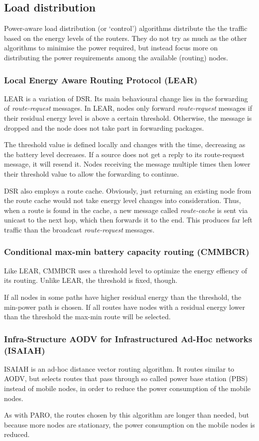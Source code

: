 \subsection{Load distribution}
Power-aware load distribution (or `control') algorithms distribute the the
traffic based on the energy levels of the routers.
They do not try as much as the other algorithms to minimise the power required,
but instead focus more on distributing the power requirements among the available (routing) nodes.

\subsubsection{Local Energy Aware Routing Protocol (LEAR)}
LEAR\cite{woo2001non} is a variation of DSR.
Its main behavioural change lies in the forwarding of \textit{route-request} messages.
In LEAR, nodes only forward \textit{route-request} messages if their residual
energy level is above a certain threshold. Otherwise, the message is dropped
and the node does not take part in forwarding packages.

The threshold value is defined locally and changes with the time, decreasing
as the battery level decreases. If a source does not get a reply to its
route-request message, it will resend it. Nodes receiving the message multiple
times then lower their threshold value to allow the forwarding to continue.

DSR also employs a route cache. Obviously, just returning an existing node
from the route cache would not take energy level changes into consideration.
Thus, when a route is found in the cache, a new message called \textit{route-cache}
is sent via unicast to the next hop, which then forwards it to the end. This
produces far left traffic than the broadcast \textit{route-request} messages.

\subsubsection{Conditional max-min battery capacity routing (CMMBCR)}
Like LEAR, CMMBCR\cite{toh2001maximum} uses a threshold level to optimize
the energy effiency of its routing.
Unlike LEAR, the threshold is fixed, though.

If all nodes in some paths have higher residual energy than the threshold,
the min-power path is chosen.
If all routes have nodes with a residual energy lower than the threshold the
max-min route will be selected.

\subsubsection{Infra-Structure AODV for Infrastructured Ad-Hoc networks (ISAIAH)}
ISAIAH\cite{lindgren2002infrastructured} is an ad-hoc distance vector routing
algorithm. It routes similar to AODV, but selects routes that pass through
so called power base station (PBS) instead of mobile nodes, in order to reduce
the power consumption of the mobile nodes.

As with PARO, the routes chosen by this algorithm are longer than needed, but
because more nodes are stationary, the power consumption on the mobile nodes
is reduced.
